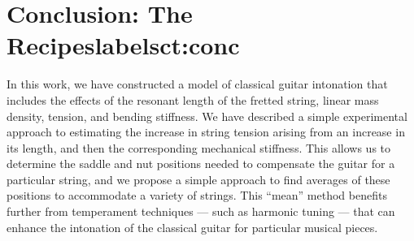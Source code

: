 %
%
%

 \section{Conclusion: The Recipeslabel{sct:conc}}

 In this work, we have constructed a model of classical guitar intonation that includes the effects of the resonant length of the fretted string, linear mass density, tension, and bending stiffness. We have described a simple experimental approach to estimating the increase in string tension arising from an increase in its length, and then the corresponding mechanical stiffness. This allows us to determine the saddle and nut positions needed to compensate the guitar for a particular string, and we propose a simple approach to find averages of these positions to accommodate a variety of strings. This ``mean'' method benefits further from temperament techniques --- such as harmonic tuning --- that can enhance the intonation of the classical guitar for particular musical pieces.

